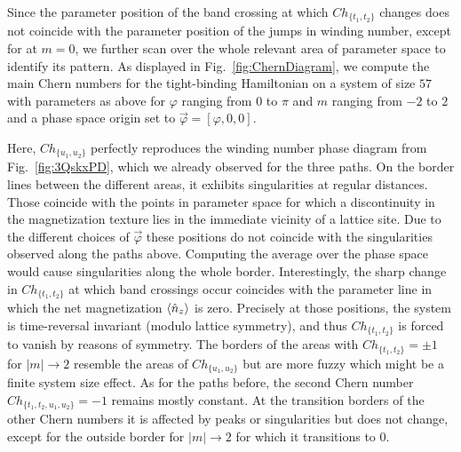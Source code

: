 \documentclass[submission, Phys]{SciPost}
\begin{document}
Since the parameter position of the band crossing at which $Ch_{\lbrace t_1, t_2 \rbrace }$ changes does not coincide with the parameter position of the jumps in winding number, except for at $m=0$, we further scan over the whole relevant area of parameter space to identify its pattern. As displayed in Fig.~\ref{fig:ChernDiagram}, we compute the main Chern numbers for the tight-binding Hamiltonian on a system of size $57$ with parameters as above for $\varphi$ ranging from $0$ to $\pi$ and $m$ ranging from $-2$ to $2$ and a phase space origin set to $\vec{\varphi}=[\varphi,0,0]$.
\figureXIa

Here, $Ch_{\lbrace u_1, u_2 \rbrace }$ perfectly reproduces the winding number phase diagram from Fig.~\ref{fig:3QskxPD}, which we already observed for the three paths.
On the border lines between the different areas, it exhibits singularities at regular distances. Those coincide with the points in parameter space for which a discontinuity in the magnetization texture lies in the immediate vicinity of a lattice site. Due to the different choices of $\vec{\varphi}$ these positions do not coincide with the singularities observed along the paths above. Computing the average over the phase space would cause singularities along the whole border.
Interestingly, the sharp change in $Ch_{\lbrace t_1, t_2 \rbrace }$ at which band crossings occur coincides with the parameter line in which the net magnetization $\braket{\hat{n}_z}$ is zero.
Precisely at those positions, the system is time-reversal invariant (modulo lattice symmetry), and thus $Ch_{\lbrace t_1, t_2 \rbrace }$ is forced to vanish by reasons of symmetry. 
The borders of the areas with $Ch_{\lbrace t_1, t_2 \rbrace }=\pm1$ for $|m|\to 2$ resemble the areas of $Ch_{\lbrace u_1, u_2 \rbrace }$ but are more fuzzy which might be a finite system size effect.
As for the paths before, the second Chern number $Ch_{\lbrace t_1, t_2, u_1, u_2 \rbrace }=-1$ remains mostly constant. At the transition borders of the other Chern numbers it is affected by peaks or singularities but does not change, except for the outside border for $|m|\to 2$ for which it transitions to $0$.
\end{document}
